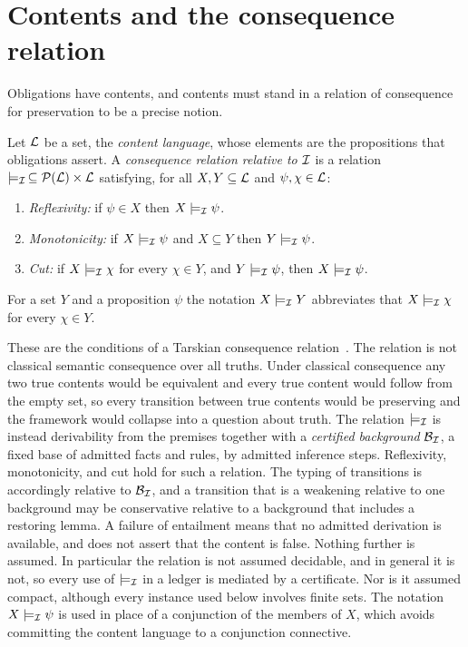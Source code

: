 \section{Contents and the consequence relation}

Obligations have contents, and contents must stand in a relation of consequence for preservation to be a precise notion.

\begin{definition}
Let $\mathcal{L}$ be a set, the \emph{content language}, whose elements are the propositions that obligations assert. A \emph{consequence relation relative to $\mathcal{I}$} is a relation $\models_{\mathcal{I}}\, \subseteq \mathcal{P}(\mathcal{L}) \times \mathcal{L}$ satisfying, for all $X, Y \subseteq \mathcal{L}$ and $\psi, \chi \in \mathcal{L}$:
\begin{enumerate}[label=(C\arabic*), leftmargin=2.4em]
\item \emph{Reflexivity:} if $\psi \in X$ then $X \models_{\mathcal{I}} \psi$.
\item \emph{Monotonicity:} if $X \models_{\mathcal{I}} \psi$ and $X \subseteq Y$ then $Y \models_{\mathcal{I}} \psi$.
\item \emph{Cut:} if $X \models_{\mathcal{I}} \chi$ for every $\chi \in Y$, and $Y \models_{\mathcal{I}} \psi$, then $X \models_{\mathcal{I}} \psi$.
\end{enumerate}
For a set $Y$ and a proposition $\psi$ the notation $X \models_{\mathcal{I}} Y$ abbreviates that $X \models_{\mathcal{I}} \chi$ for every $\chi \in Y$.
\end{definition}

These are the conditions of a Tarskian consequence relation~\cite{Tarski36}. The relation is not classical semantic consequence over all truths. Under classical consequence any two true contents would be equivalent and every true content would follow from the empty set, so every transition between true contents would be preserving and the framework would collapse into a question about truth. The relation $\models_{\mathcal{I}}$ is instead derivability from the premises together with a \emph{certified background} $\mathcal{B}_{\mathcal{I}}$, a fixed base of admitted facts and rules, by admitted inference steps. Reflexivity, monotonicity, and cut hold for such a relation. The typing of transitions is accordingly relative to $\mathcal{B}_{\mathcal{I}}$, and a transition that is a weakening relative to one background may be conservative relative to a background that includes a restoring lemma. A failure of entailment means that no admitted derivation is available, and does not assert that the content is false. Nothing further is assumed. In particular the relation is not assumed decidable, and in general it is not, so every use of $\models_{\mathcal{I}}$ in a ledger is mediated by a certificate. Nor is it assumed compact, although every instance used below involves finite sets. The notation $X \models_{\mathcal{I}} \psi$ is used in place of a conjunction of the members of $X$, which avoids committing the content language to a conjunction connective.

